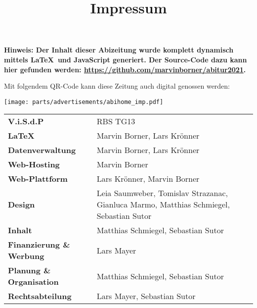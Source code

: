 \title{Impressum}


\textbf{Hinweis: Der Inhalt dieser Abizeitung wurde komplett dynamisch mittels \LaTeX\  und JavaScript generiert. Der Source-Code dazu kann hier gefunden werden: \url{https://github.com/marvinborner/abitur2021}.}

Mit folgendem QR-Code kann diese Zeitung auch digital genossen werden:

\begin{center}
\end{center}

\texttt{[image: parts/advertisements/abihome\_imp.pdf]}

\begin{table}[b]
	\begin{tabular}{ l l }
		\textbf{V.i.S.d.P}               & RBS TG13                                                                                \\ %
		\textbf{\LaTeX}                  & Marvin Borner, Lars Krönner                                                             \\
		\textbf{Datenverwaltung}         & Marvin Borner, Lars Krönner                                                             \\
		\textbf{Web-Hosting}             & Marvin Borner                                                                           \\
		\textbf{Web-Plattform}           & Lars Krönner, Marvin Borner                                                             \\
		\textbf{Design}                  & Leia Saumweber, Tomislav Strazanac, Gianluca Marmo, Matthias Schmiegel, Sebastian Sutor \\
		\textbf{Inhalt}                  & Matthias Schmiegel, Sebastian Sutor                                                     \\
		\textbf{Finanzierung \& Werbung} & Lars Mayer                                                                              \\
		\textbf{Planung \& Organisation} & Matthias Schmiegel, Sebastian Sutor                                                     \\
		\textbf{Rechtsabteilung}         & Lars Mayer, Sebastian Sutor
	\end{tabular}
\end{table}
